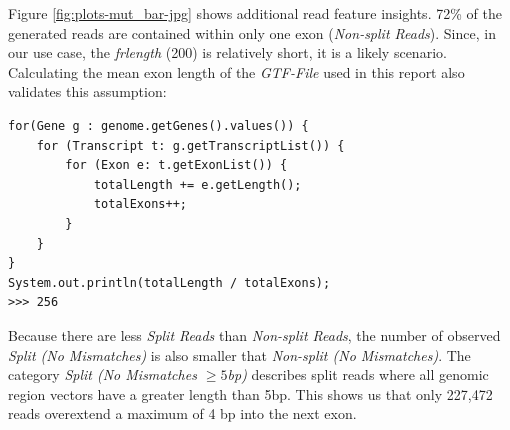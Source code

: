 \documentclass[12pt]{article}
\begin{document}
Figure \ref{fig:plots-mut_bar-jpg} shows additional read feature insights. 
72\% of the generated reads are contained within only one exon (\textit{Non-split Reads}).
Since, in our use case, the \textit{frlength} (200) is relatively short, it is a likely scenario.
Calculating the mean exon length of the \textit{GTF-File} used in this report also validates
this assumption:

\begin{verbatim}
for(Gene g : genome.getGenes().values()) {
    for (Transcript t: g.getTranscriptList()) {
        for (Exon e: t.getExonList()) {
            totalLength += e.getLength();
            totalExons++;
        }
    }
}
System.out.println(totalLength / totalExons);
>>> 256
\end{verbatim}
 
Because there are less \textit{Split Reads} than \textit{Non-split Reads}, the number of observed
\textit{Split (No Mismatches)} is also smaller that \textit{Non-split (No Mismatches)}.
The category \textit{Split (No Mismatches $\ge 5$bp)} describes split reads
where all genomic region vectors have a greater length than 5bp.
This shows us that only 227,472 reads overextend a maximum of 4 bp into the next exon.





\end{document}
